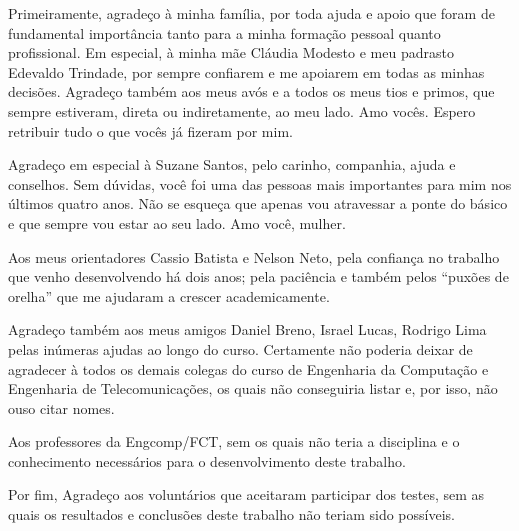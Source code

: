 Primeiramente, agradeço à minha família, por toda ajuda e apoio que foram de
fundamental importância tanto para a minha formação pessoal quanto profissional.
Em especial, à minha mãe Cláudia Modesto e meu padrasto Edevaldo Trindade, por
sempre confiarem e me apoiarem em todas as minhas decisões. Agradeço também aos
meus avós e a todos os meus tios e primos, que sempre estiveram, direta ou
indiretamente, ao meu lado. Amo vocês. Espero retribuir tudo o que vocês
já fizeram por mim.

Agradeço em especial à Suzane Santos, pelo carinho, companhia, ajuda e
conselhos. Sem dúvidas, você foi uma das pessoas mais importantes para mim nos
últimos quatro anos. Não se esqueça que apenas vou atravessar a ponte do básico 
e que sempre vou estar ao seu lado. Amo você, mulher.  

Aos meus orientadores Cassio Batista e Nelson Neto, pela confiança no trabalho
que venho desenvolvendo há dois anos; pela paciência e também pelos ``puxões de
orelha'' que me ajudaram a crescer academicamente. 

Agradeço também aos meus amigos Daniel Breno, Israel Lucas, Rodrigo Lima pelas
inúmeras ajudas ao longo do curso. Certamente não poderia deixar de agradecer à
todos os demais colegas do curso de Engenharia da Computação e Engenharia de
Telecomunicações, os quais não conseguiria listar e, por isso, não ouso citar
nomes.

Aos professores da Engcomp/FCT, sem os quais não teria a disciplina e o
conhecimento necessários para o desenvolvimento deste trabalho.

Por fim, Agradeço aos voluntários que aceitaram participar dos testes, sem as quais
os resultados e conclusões deste trabalho não teriam sido possíveis.
